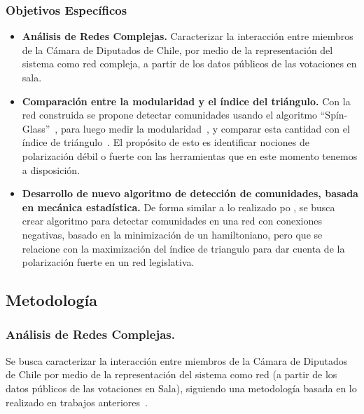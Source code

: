 \documentclass{proyectotesis}
\begin{document}

\subsubsection*{Objetivos Específicos}
\begin{itemize}
\item    {\bf Análisis de Redes Complejas.} Caracterizar la interacción entre miembros de la Cámara de Diputados de Chile, por medio de la representación del sistema como red compleja, a partir de los datos públicos de las votaciones en sala.

\item{\bf Comparación entre la modularidad y el índice del triángulo.} Con la red construida se propone detectar comunidades usando el algoritmo ``Spín-Glass''~\cite{reichardt_statistical_2006}, para luego medir la modularidad~\cite{newman_finding_2004}, y comparar esta cantidad con el índice de triángulo~\cite{aref_measuring_2018}. El propósito de esto es identificar nociones de polarización débil o fuerte con las herramientas que en este momento tenemos a disposición.

\item {\bf Desarrollo de nuevo algoritmo de detección de comunidades, basada en mecánica estadística.} De forma similar a lo realizado po \citet{reichardt_statistical_2006}, se busca crear algoritmo para detectar comunidades en una red con conexiones negativas, basado en la minimización de un hamiltoniano, pero que se relacione con la maximización del índice de triangulo para dar cuenta de la polarización fuerte en un red legislativa.

\end{itemize}

\subsection{Metodología}
\subsubsection{Análisis de Redes Complejas.}
Se busca caracterizar la interacción entre miembros de la Cámara de Diputados de Chile por medio de la representación del sistema como red (a partir de los datos públicos de las votaciones en Sala), siguiendo una metodología basada en lo realizado en trabajos anteriores~\cite{andris_rise_2015, marenco_time_2020, schoch_legislators_2020, intal_dissent_2021}. 
\end{document}
